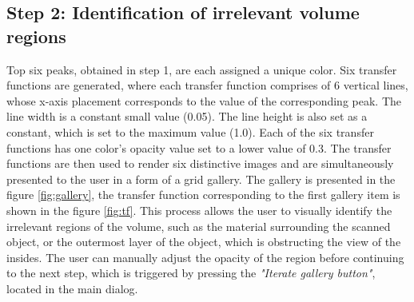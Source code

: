 \documentclass{egpubl-eurovis-short}
\begin{document}
\subsection{Step 2: Identification of irrelevant volume regions}
Top six peaks, obtained in step 1, are each assigned a unique color. Six transfer functions are generated, where each transfer function comprises of 6 vertical lines, whose x-axis placement corresponds to the value of the corresponding peak. The line width is a constant small value (0.05). The line height is also set as a constant, which is set to the maximum value (1.0). Each of the six transfer functions has one color's opacity value set to a lower value of 0.3. The transfer functions are then used to render six distinctive images and are simultaneously presented to the user in a form of a grid gallery. The gallery is presented in the figure \ref{fig:gallery}, the transfer function corresponding to the first gallery item is shown in the figure \ref{fig:tf}. 
This process allows the user to visually identify the irrelevant regions of the volume, such as the material surrounding the scanned object, or the outermost layer of the object, which is obstructing the view of the insides. The user can manually adjust the opacity of the region before continuing to the next step, which is triggered by pressing the \textit{"Iterate gallery button"}, located in the main dialog.
\end{document}
